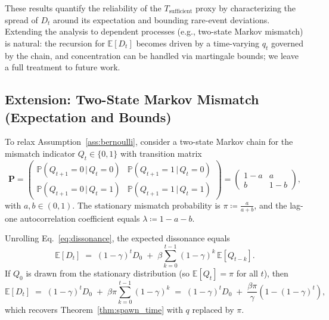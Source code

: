 \documentclass{article}
\numberwithin{figure}{section}
\numberwithin{table}{section}
\numberwithin{algorithm}{section}
\begin{document}
These results quantify the reliability of the $T_{\mathrm{sufficient}}$ proxy by characterizing the spread of $D_t$ around its expectation and bounding rare-event deviations. Extending the analysis to dependent processes (e.g., two-state Markov mismatch) is natural: the recursion for $\mathbb{E}[D_t]$ becomes driven by a time-varying $q_t$ governed by the chain, and concentration can be handled via martingale bounds; we leave a full treatment to future work.

\subsection{Extension: Two-State Markov Mismatch (Expectation and Bounds)}
\label{subsec:markov_mismatch}
To relax Assumption~\ref{ass:bernoulli}, consider a two-state Markov chain for the mismatch indicator $Q_t \in \{0,1\}$ with transition matrix
\[
\mathbf{P}=
\begin{pmatrix}
\mathbb{P}(Q_{t{+}1}{=}0\,|\,Q_t{=}0) & \mathbb{P}(Q_{t{+}1}{=}1\,|\,Q_t{=}0) \\
\mathbb{P}(Q_{t{+}1}{=}0\,|\,Q_t{=}1) & \mathbb{P}(Q_{t{+}1}{=}1\,|\,Q_t{=}1)
\end{pmatrix}
=
\begin{pmatrix}
1-a & a \\ b & 1-b
\end{pmatrix},
\]
with $a,b\in(0,1)$. The stationary mismatch probability is $\pi \coloneqq \frac{a}{a+b}$, and the lag-one autocorrelation coefficient equals $\lambda \coloneqq 1-a-b$.

Unrolling Eq.~\eqref{eq:dissonance}, the expected dissonance equals
\[
\mathbb{E}[D_t] \;=\; (1-\gamma)^t D_0 \;+\; \beta \sum_{k=0}^{t-1} (1-\gamma)^k\, \mathbb{E}[Q_{t-k}].
\]
If $Q_0$ is drawn from the stationary distribution (so $\mathbb{E}[Q_t]{=}\pi$ for all $t$), then
\[
\mathbb{E}[D_t] \;=\; (1-\gamma)^t D_0 \;+\; \beta \pi \sum_{k=0}^{t-1} (1-\gamma)^k
\;=\; (1-\gamma)^t D_0 \;+\; \frac{\beta \pi}{\gamma}\left(1-(1-\gamma)^t\right),
\]
which recovers Theorem~\ref{thm:spawn_time} with $q$ replaced by $\pi$.
\end{document}
